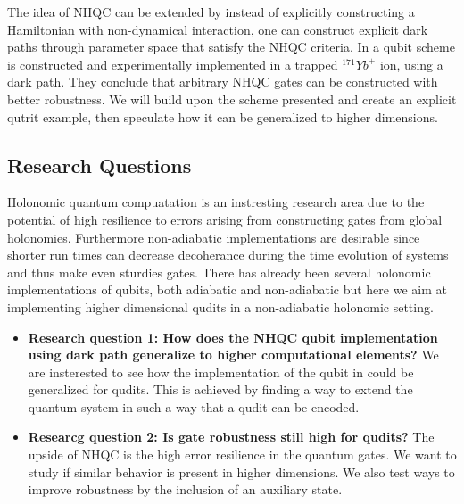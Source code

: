 The idea of NHQC can be extended by instead of explicitly constructing a Hamiltonian with non-dynamical interaction, one can construct explicit dark paths through parameter space that satisfy the NHQC criteria. In \cite{darkpath} a qubit scheme is constructed and experimentally implemented in a trapped $^{171}Yb^{+}$ ion, using a dark path. They conclude that arbitrary NHQC gates can be constructed with better robustness. We will build upon the scheme presented and create an explicit qutrit example, then speculate how it can be generalized to higher dimensions.

\subsection{Research Questions}

Holonomic quantum compuatation is an instresting research area due to the potential of high resilience to errors arising from constructing gates from global holonomies. Furthermore non-adiabatic implementations are desirable since shorter run times can decrease decoherance during the time evolution of systems and thus make even sturdies gates. There has already been several holonomic implementations of qubits, both adiabatic and non-adiabatic \cite{HQC, NHQC} but here we aim at implementing higher dimensional qudits in a non-adiabatic holonomic setting. 

\begin{itemize}
\item \textbf{Research question 1: How does the NHQC qubit implementation using dark path generalize to higher computational elements?} We are insterested to see how the implementation of the qubit in \cite{darkpath} could be generalized for qudits. This is achieved by finding a way to extend the quantum system in such a way that a qudit can be encoded. 

\item \textbf{Researcg question 2: Is gate robustness still high for qudits?} The upside of NHQC is the high error resilience in the quantum gates. We want to study if similar behavior is present in higher dimensions. We also test ways to improve robustness by the inclusion of an auxiliary state.



\end{itemize}







